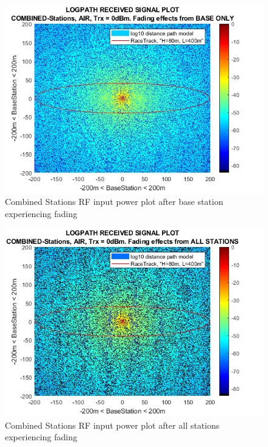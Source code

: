 \begin{figure}[h]
	\centering
	\includegraphics[width=\linewidth]{theory/fading/fig/logpathReceivedSignal_combinedStations_baseOnly.png}
	\caption{Combined Stations RF input power plot after base station experiencing fading}
	\label{fig:logpathReceivedSignal_combinedStations_baseOnly}
\end{figure}

\begin{figure}[h]
\centering
\includegraphics[width=\linewidth]{theory/fading/fig/logpathReceivedSignal_combinedStations_allStations.png}
\caption{Combined Stations RF input power plot after all stations experiencing fading}
\label{fig:logpathReceivedSignal_combinedStations_allStations}
\end{figure}

